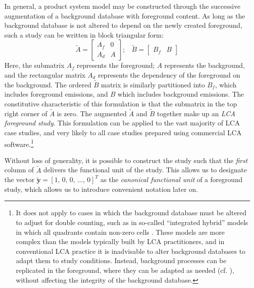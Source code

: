 In general, a product system model may be constructed through the successive augmentation of a background database with foreground content.  As long as the background database is not altered to depend on the newly created foreground, such a study can be written in block triangular form:
\begin{equation}
\tilde{A} = \left[\begin{array}{cc}
A_f & 0 \\
A_d &  A
  \end{array}
\right];\;\;\;
  \tilde{B} = \left[\begin{array}{cc} B_f & B   \end{array}\right]
\label{eqn:foreground}
\end{equation}
Here, the submatrix $A_f$ represents the foreground; $A$ represents the background, and the rectangular matrix $A_d$ represents the dependency of the foreground on the background.  The ordered $\tilde{B}$ matrix is similarly partitioned into $B_f$, which includes foreground emissions, and $B$ which includes background emissions. The constitutive characteristic of this formulation is that the submatrix in the top right corner of $\tilde{A}$ is zero.  The augmented $\tilde{A}$ and $\tilde{B}$ together make up an \emph{LCA foreground study}.  This formulation can be applied to the vast majority of LCA case studies, and very likely to all case studies prepared using commercial LCA software.\footnote{It does not apply to cases in which the background database must be altered to adjust for double counting, such as in so-called ``integrated hybrid'' models in which all quadrants contain non-zero cells \citep{Suh2004}.  These models are more complex than the models typically built by LCA practitioners, and in conventional LCA practice it is inadvisable to alter background databases to adapt them to study conditions.  Instead, background processes can be replicated in the foreground, where they can be adapted as needed (cf. \cite{Bourgault_JLCA_2013}), without affecting the integrity of the background database.}

Without loss of generality, it is possible to construct the study such that the \textit{first} column of $\tilde{A}$ delivers the functional unit of the study.  This allows us to designate the vector $\tilde{\mathbf{y}} =  [ 1,\, 0,\, 0 ,\,\ldots,\, 0]^{T}$ as the \textit{canonical functional unit} of a foreground study, which allows us to introduce convenient notation later on.  

